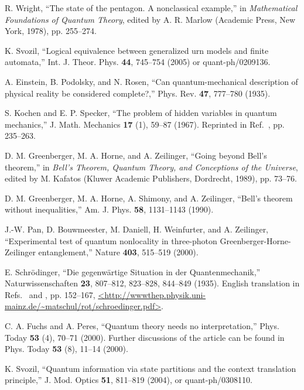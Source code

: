 \documentclass[prb,amssymb,preprint]{revtex4}
\begin{document}
\begin{thebibliography}{10}
R. Wright, ``The state of the pentagon. A nonclassical example,'' in
\emph{Mathematical Foundations of Quantum Theory}, edited by A. R.
Marlow (Academic Press, New York, 1978), pp.
255--274.

K. Svozil, ``Logical equivalence between generalized urn models and
finite automata,'' Int. J. Theor. Phys. \textbf{44},
745--754 (2005) or quant-ph/0209136.

A. Einstein, B. Podolsky, and N. Rosen, ``Can quantum-mechanical
description of physical reality be considered complete?,'' Phys. Rev.
\textbf{47}, 777--780 (1935).

S. Kochen and E. P. Specker, ``The problem of hidden variables in
quantum mechanics,'' J. Math. Mechanics \textbf{17} (1),
59--87 (1967). Reprinted in Ref.~, pp. 235--263.

D. M. Greenberger, M. A. Horne, and A. Zeilinger, ``Going beyond Bell's
theorem,'' in \emph{Bell's Theorem, Quantum Theory, and Conceptions of the
{U}niverse}, edited by M. Kafatos (Kluwer Academic
Publishers,
Dordrecht, 1989), pp. 73--76.

D. M. Greenberger, M. A. Horne, A. Shimony, and A. Zeilinger,
``Bell's
theorem without inequalities,'' Am. J. Phys. \textbf{58},
1131--1143 (1990).

J.-W. Pan, D. Bouwmeester, M. Daniell, H. Weinfurter, and A. Zeilinger,
``Experimental test of quantum nonlocality in three-photon
Greenberger-Horne-Zeilinger entanglement,'' Nature \textbf{403},
515--519 (2000).



E. Schr{\"{o}}dinger, ``Die gegenw{\"{a}}rtige {S}ituation in der
{Q}uantenmechanik,'' Naturwissenschaften \textbf{23}, 807--812, 823--828,
844--849 (1935). English translation in Refs.~ and
, pp.
152--167,
\urlprefix\url{<http://wwwthep.physik.uni-mainz.de/~matschul/rot/schroedinger.pdf>}.

C. A. Fuchs and A. Peres, ``Quantum theory needs no interpretation,''
Phys. Today \textbf{53} (4), 70--71 (2000). Further discussions of the
article can be found in Phys.
Today {\bf 53} (8), 11--14 (2000).

K. Svozil, ``Quantum information via state partitions and the context
translation principle,'' J. Mod. Optics \textbf{51}, 811--819
(2004), or quant-ph/0308110.


\end{thebibliography}
\end{document}
